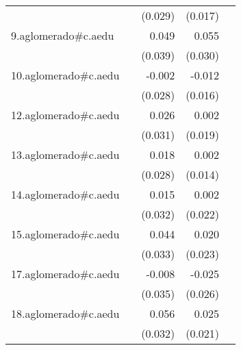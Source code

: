 {\begin{longtable}{l*{4}{D{.}{.}{-1}}}
            &                     &     (0.029)         &     (0.017)         &                     \\
\addlinespace
9.aglomerado#c.aedu&                     &       0.049         &       0.055         &                     \\
            &                     &     (0.039)         &     (0.030)         &                     \\
\addlinespace
10.aglomerado#c.aedu&                     &      -0.002         &      -0.012         &                     \\
            &                     &     (0.028)         &     (0.016)         &                     \\
\addlinespace
12.aglomerado#c.aedu&                     &       0.026         &       0.002         &                     \\
            &                     &     (0.031)         &     (0.019)         &                     \\
\addlinespace
13.aglomerado#c.aedu&                     &       0.018         &       0.002         &                     \\
            &                     &     (0.028)         &     (0.014)         &                     \\
\addlinespace
14.aglomerado#c.aedu&                     &       0.015         &       0.002         &                     \\
            &                     &     (0.032)         &     (0.022)         &                     \\
\addlinespace
15.aglomerado#c.aedu&                     &       0.044         &       0.020         &                     \\
            &                     &     (0.033)         &     (0.023)         &                     \\
\addlinespace
17.aglomerado#c.aedu&                     &      -0.008         &      -0.025         &                     \\
            &                     &     (0.035)         &     (0.026)         &                     \\
\addlinespace
18.aglomerado#c.aedu&                     &       0.056         &       0.025         &                     \\
            &                     &     (0.032)         &     (0.021)         &                     \\

\end{longtable}}
